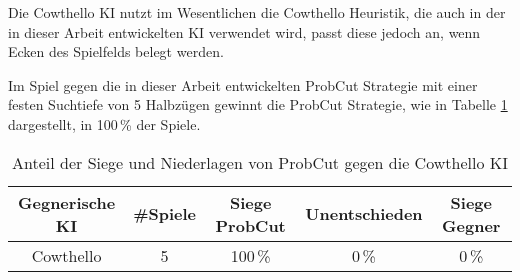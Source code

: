 Die Cowthello KI nutzt im Wesentlichen die Cowthello Heuristik, die auch in der in dieser Arbeit entwickelten KI
verwendet wird, passt diese jedoch an, wenn Ecken des Spielfelds belegt werden. \cite{cowthello}

Im Spiel gegen die in dieser Arbeit entwickelten ProbCut Strategie mit einer festen Suchtiefe von 5 Halbzügen gewinnt
die ProbCut Strategie, wie in Tabelle \ref{table:comp:cowthello} dargestellt, in 100\,\%  der Spiele.

\begin{table}[H]
\centering
\begin{tabular}{c|c|ccc}
\hline
Gegnerische KI & \#Spiele & Siege ProbCut & Unentschieden & Siege Gegner \\
\hline
Cowthello & 5 & 100\,\% & 0\,\% & 0\,\% \\
\hline
\end{tabular}
\caption{Anteil der Siege und Niederlagen von ProbCut gegen die Cowthello KI}
\label{table:comp:cowthello}
\end{table}